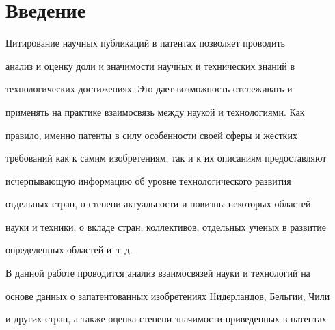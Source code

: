 







      \thispagestyle{headings}





      


            \label{st\stat}


            


            \vspace*{-12pt}








\section{Введение}


     


     Цитирование научных публикаций в патентах позволяет проводить 


анализ и оценку доли и значимости научных и технических знаний в 


технологических достижениях. Это дает возможность отслеживать и 


применять на практике взаимосвязь между наукой и технологиями. Как 


правило, именно патенты в силу особенности своей сферы и жестких 


требований как к самим изобретениям, так и к их описаниям предоставляют 


исчерпывающую информацию об уровне технологического развития 


отдельных стран, о степени актуальности и новизны некоторых областей 


науки и техники, о вкладе стран, коллективов, отдельных ученых в развитие 


определенных областей и~т.\,д.


    


В данной работе проводится анализ взаимосвязей науки и технологий на 


основе данных о запатентованных изобретениях Нидерландов, Бельгии, Чили 


и других стран, а также оценка степени значимости приведенных в патентах 


